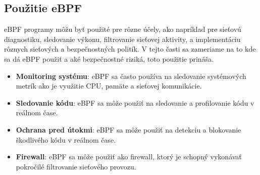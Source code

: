\subsection{Použitie eBPF}
eBPF programy môžu byť použité pre rôzne účely, ako napríklad pre sieťovú diagnostiku, sledovanie výkonu, filtrovanie sieťovej aktivity, 
a implementáciu rôznych sieťových a bezpečnostných politík. V tejto časti sa zameriame na to kde sa dá eBPF použiť a aké bezpečnostné riziká, 
toto použitie prináša.
\begin{itemize}
\item \textbf{Monitoring systému}: eBPF sa často používa na sledovanie systémových metrík ako je využitie CPU, pamäte a sieťovej komunikácie.
\item \textbf{Sledovanie kódu}: eBPF sa môže použiť na sledovanie a profilovanie kódu v reálnom čase.
\item \textbf{Ochrana pred útokmi}: eBPF sa môže použiť na detekciu a blokovanie škodlivého kódu v reálnom čase.
\item \textbf{Firewall}: eBPF sa môže použiť ako firewall, ktorý je schopný vykonávať pokročilé filtrovanie sieťového provozu.
\end{itemize}

